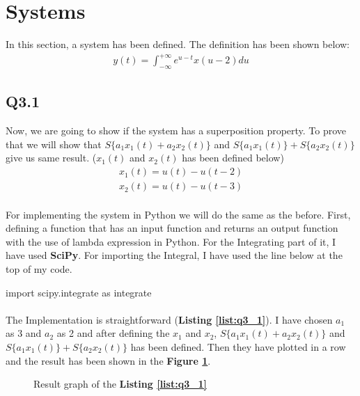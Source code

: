 \section{Systems}
In this section, a system has been defined. 
The definition has been shown below:
\begin{align}
    y(t) = \int_{-\infty}^{+\infty} e^{u-t}x(u-2) du
    \label{y}
\end{align}
\subsection{Q3.1}
Now, we are going to show if the system has 
a superposition property. To prove that we will show that
 $S\{a_1x_1(t)+a_2x_2(t)\}$ and $S\{a_1x_1(t)\}+
 S\{a_2x_2(t)\}$ give us same result. ($ x_1(t)$ and 
 $x_2(t)$ has been defined below)
 \begin{align}
    x_1(t) = u(t)-u(t-2) \label{x_1}\\
    x_2(t) = u(t)-u(t-3)
    \label{x_2}
\end{align}
\paragraph{}For implementing the system in Python we 
will do the same as the before. First, defining a 
function that has an input function and returns an 
output function with the use of lambda expression in 
Python. For the Integrating part of it, I have 
used \textbf{SciPy}. For importing the Integral, I 
have used the line below at the top of my code.
\begin{python}
import scipy.integrate as integrate
\end{python}
\paragraph{}The Implementation is straightforward 
(\textbf{Listing \ref{list:q3_1}}). I have chosen $a_1$ as 3 and 
$a_2$ as 2 and after defining the $x_1$ and $x_2$, 
$S\{a_1x_1(t)+a_2x_2(t)\}$ and $S\{a_1x_1(t)\}+ 
S\{a_2x_2(t)\}$ has been defined. Then they have 
plotted in a row and the result has been shown in 
the \textbf{Figure \ref{fig:Q3_1}}.

\begin{figure}[H]
  \centering
  \scalebox{0.4}{}
  \caption{Result graph of the \textbf{Listing \ref{list:q3_1}}}
  \label{fig:Q3_1}
\end{figure}

